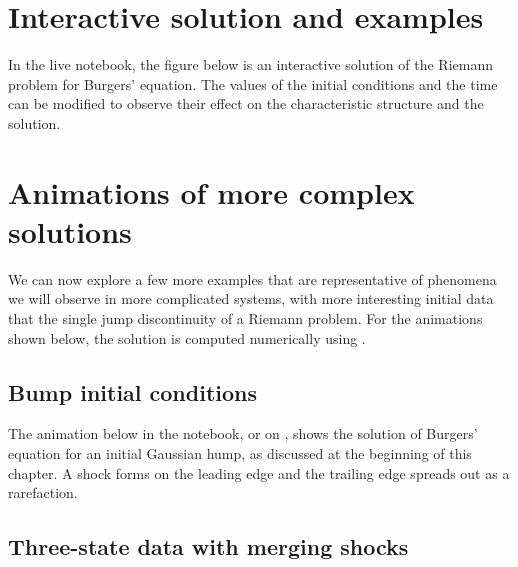 \documentclass{SIAMbook2016}
\begin{document}
\hypertarget{interactive-solution-and-examples}{%
\section{Interactive solution and
examples}\label{interactive-solution-and-examples}}

In the live notebook, the figure below is an interactive solution of the
Riemann problem for Burgers' equation. The values of the initial
conditions and the time can be modified to observe their effect on the
characteristic structure and the solution.

\hypertarget{animations-of-more-complex-solutions}{%
\section{Animations of more complex
solutions}\label{animations-of-more-complex-solutions}}

We can now explore a few more examples that are representative of
phenomena we will observe in more complicated systems, with more
interesting initial data that the single jump discontinuity of a Riemann
problem. For the animations shown below, the solution is computed
numerically using .

\hypertarget{bump-initial-conditions}{%
\subsection{Bump initial conditions}\label{bump-initial-conditions}}

The animation below in the notebook, or on
, shows the solution of Burgers' equation for an initial
Gaussian hump, as discussed at the beginning of this chapter. A shock
forms on the leading edge and the trailing edge spreads out as a
rarefaction.

\hypertarget{three-state-data-with-merging-shocks}{%
\subsection{Three-state data with merging
shocks}\label{three-state-data-with-merging-shocks}}
\end{document}
